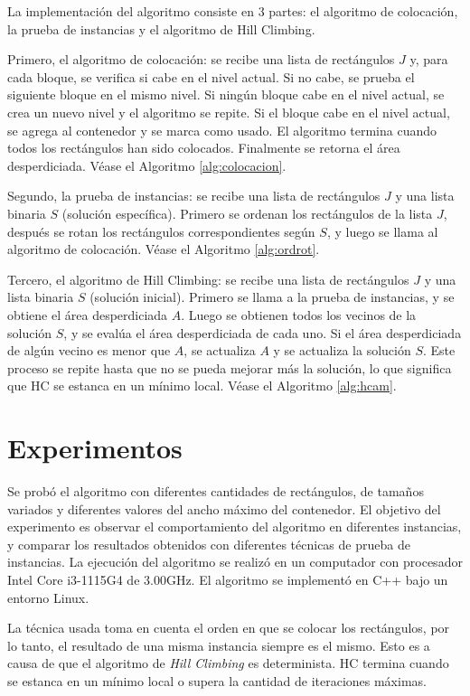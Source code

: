 \documentclass[letter, 10pt]{article}
\begin{document}
La implementación del algoritmo consiste en 3 partes: el algoritmo de colocación, la prueba de instancias y el algoritmo de Hill Climbing.

Primero, el algoritmo de colocación: se recibe una lista de rectángulos $J$ y, para cada bloque, se verifica si cabe en el nivel actual. Si no cabe, se prueba el siguiente bloque en el mismo nivel. Si ningún bloque cabe en el nivel actual, se crea un nuevo nivel y el algoritmo se repite. Si el bloque cabe en el nivel actual, se agrega al contenedor y se marca como usado. El algoritmo termina cuando todos los rectángulos han sido colocados. Finalmente se retorna el área desperdiciada. Véase el Algoritmo \ref{alg:colocacion}.

Segundo, la prueba de instancias: se recibe una lista de rectángulos $J$ y una lista binaria $S$ (solución específica). Primero se ordenan los rectángulos de la lista $J$, después se rotan los rectángulos correspondientes según $S$, y luego se llama al algoritmo de colocación. Véase el Algoritmo \ref{alg:ordrot}.

Tercero, el algoritmo de Hill Climbing: se recibe una lista de rectángulos $J$ y una lista binaria $S$ (solución inicial). Primero se llama a la prueba de instancias, y se obtiene el área desperdiciada $A$. Luego se obtienen todos los vecinos de la solución $S$, y se evalúa el área desperdiciada de cada uno. Si el área desperdiciada de algún vecino es menor que $A$, se actualiza $A$ y se actualiza la solución $S$. Este proceso se repite hasta que no se pueda mejorar más la solución, lo que significa que HC se estanca en un mínimo local. Véase el Algoritmo \ref{alg:hcam}.






\section{Experimentos}

Se probó el algoritmo con diferentes cantidades de rectángulos, de tamaños variados y diferentes valores del ancho máximo del contenedor. El objetivo del experimento es observar el comportamiento del algoritmo en diferentes instancias, y comparar los resultados obtenidos con diferentes técnicas de prueba de instancias. La ejecución del algoritmo se realizó en un computador con procesador Intel Core i3-1115G4 de 3.00GHz. El algoritmo se implementó en C++ bajo un entorno Linux.

La técnica usada toma en cuenta el orden en que se colocar los rectángulos, por lo tanto, el resultado de una misma instancia siempre es el mismo. Esto es a causa de que el algoritmo de \textit{Hill Climbing} es determinista. HC termina cuando se estanca en un mínimo local o supera la cantidad de iteraciones máximas.
\end{document}
